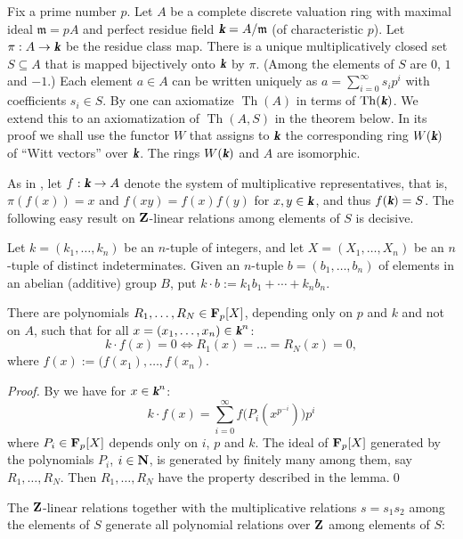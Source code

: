 \documentclass[amalog]{svjour}
\def \F {{\bold F}}
\def \N {\bold N}
\def \Z {{\bold Z}}
\def\k{\text{\fontseries{b}\fontshape{it}\selectfont k}}
\def \m{\mathfrak{m}}
\begin{document}
Fix a prime number $p$. Let $A$ be a complete discrete valuation ring
with maximal ideal $\m=pA$ and perfect residue field $\k = A/\m$ (of
characteristic $p$). Let $\pi : A \to \k$ be the residue class map.
There is a unique multiplicatively closed set $S \subseteq A$ that is
mapped bijectively onto $\k$ by $\pi$. (Among the elements of $S$ are
$0$, $1$ and $-1$.) Each element $a\in A$ can be written uniquely as
$a=\sum_{i=0}^{\infty}s_ip^i$ with coefficients $s_i\in S$. By \cite[p.
413]{ref3} one can axiomatize $\operatorname{Th}(A)$ in terms of
$\operatorname{Th}(\k)$. We extend this to an axiomatization of
$\operatorname{Th}(A,S)$ in the theorem below. In its proof we shall use
the functor $W$ that assigns to $\k$ the corresponding ring $W(\k)$ of
``Witt vectors'' over $\k$. The rings $W(\k)$ and $A$ are isomorphic.

As in \cite[p. 44]{ref5}, let $f : \k \to A$ denote
the system of multiplicative representatives, that is, $\pi(f(x)) = x$ and $f(xy) = f(x)f(y)$
for $x,y\in \k$, and thus $f(\k) = S$.
The following easy result on $\Z$-linear relations among elements of $S$ is decisive.

Let $k = (k_1,\dots,k_n)$ be an $n$-tuple of integers, and let $X=(X_1,\dots,X_n)$ be
an $n$-tuple of distinct indeterminates. Given an $n$-tuple $b= (b_1,\dots,b_n)$ of elements in an abelian
(additive) group $B$, put $ k\cdot b := k_1b_1 + \cdots + k_nb_n$.

\begin{lemma}There are polynomials $R_1,\dots,R_N \in \F_p[X]$,
depending only on
$p$ and
 $ k$ and not on $A$, such that for all $ x=(x_1,\dots,x_n) \in \k^n$:
$$
k \cdot f(x)= 0 \Longleftrightarrow R_1( x) = \dots = R_N(x) = 0,
$$
where  $f(x) :=(f(x_1),\dots,f(x_n).$
\end{lemma}
\begin{proof}By \cite[Prop. 9, p. 47]{ref5} we have for $x \in \k^n$:
$$ k \cdot f(x) = \sum_{i=0}^{\infty} f\bigl(P_i( x^{p^{-i}})\bigr)p^i$$
where $P_i\in \F_p[X]$ depends only on $i$, $p$ and $k$. The ideal of $\F_p[X]$
generated by the polynomials $P_i$, $i\in \N$, is generated by finitely many among them, say
$R_1,\dots,R_N$. Then $R_1,\dots,R_N$ have the property described in
the lemma.\qed\end{proof}


The $\Z$-linear relations together with the multiplicative relations $s=s_1s_2$  among the
elements of $S$ generate all polynomial relations over $\Z$ among elements of $S$:
\end{document}
